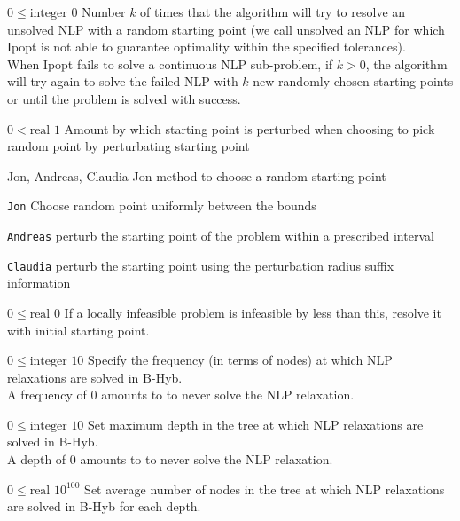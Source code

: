 %
{$0\leq\textrm{integer}$}%
{$0$}%
{Number $k$ of times that the algorithm will try to resolve an unsolved NLP with a random starting point (we call unsolved an NLP for which Ipopt is not able to guarantee optimality within the specified tolerances).\\
When Ipopt fails to solve a continuous NLP sub-problem, if $k > 0$, the algorithm will try again to solve the failed NLP with $k$ new randomly chosen starting points  or until the problem is solved with success.}%
{}

%
{$0<\textrm{real}$}%
{$1$}%
{Amount by which starting point is perturbed when choosing to pick random point by perturbating starting point}%
{}

%
{\ttfamily Jon, Andreas, Claudia}%
{Jon}%
{method to choose a random starting point}%
{\begin{list}{}{
\setlength{\parsep}{0em}
\setlength{\leftmargin}{5ex}
\setlength{\labelwidth}{2ex}
\setlength{\itemindent}{0ex}
\setlength{\topsep}{0pt}}
\item[\texttt{Jon}] Choose random point uniformly between the bounds
\item[\texttt{Andreas}] perturb the starting point of the problem within a prescribed interval
\item[\texttt{Claudia}] perturb the starting point using the perturbation radius suffix information
\end{list}
}

%
{$0\leq\textrm{real}$}%
{$0$}%
{If a locally infeasible problem is infeasible by less than this, resolve it with initial starting point.}%
{}

%
{$0\leq\textrm{integer}$}%
{$10$}%
{Specify the frequency (in terms of nodes) at which NLP relaxations are solved in B-Hyb.\\
A frequency of 0 amounts to to never solve the NLP relaxation.}%
{}

%
{$0\leq\textrm{integer}$}%
{$10$}%
{Set maximum depth in the tree at which NLP relaxations are solved in B-Hyb.\\
A depth of 0 amounts to to never solve the NLP relaxation.}%
{}

%
{$0\leq\textrm{real}$}%
{$10^{ 100}$}%
{Set average number of nodes in the tree at which NLP relaxations are solved in B-Hyb for each depth.}%
{}

